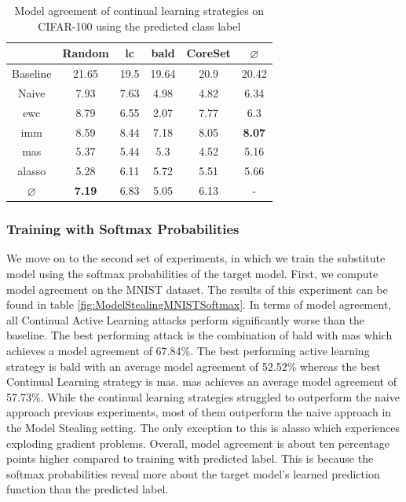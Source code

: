 \begin{table}[h]
    \centering
    \begin{tabular}{ c | c c c c | c } 
         & Random & \gls{lc} & \gls{bald} & CoreSet & $\varnothing$\\ 
        \hline
        Baseline & 21.65 & 19.5 & 19.64 & 20.9 & 20.42\\
        \hline
        Naive & 7.93 & 7.63 & 4.98 & 4.82 & 6.34\\
        \gls{ewc} & 8.79 & 6.55 & 2.07 & 7.77 & 6.3\\
        \gls{imm} & 8.59 & 8.44 & 7.18 & 8.05 & \textbf{8.07}\\
        \gls{mas} & 5.37 & 5.44 & 5.3 & 4.52 & 5.16\\
        \gls{alasso} & 5.28 & 6.11 & 5.72 & 5.51 & 5.66\\
        \hline
        $\varnothing$ & \textbf{7.19} & 6.83 & 5.05 & 6.13 & -\\
    \end{tabular}
    \caption{Model agreement of continual learning strategies on CIFAR-100 using the predicted class label}
    \label{fig:ModelStealingCIFAR100Label}
\end{table}




\subsubsection{Training with Softmax Probabilities}
\label{sec:Evaluation:MS:Regularization:Softmax}

We move on to the second set of experiments, in which we train the substitute model using the softmax probabilities of the target model. First, we compute model agreement
on the MNIST dataset. The results of this experiment can be found in table \ref{fig:ModelStealingMNISTSoftmax}. In terms of model agreement, all Continual
Active Learning attacks perform significantly worse than the baseline. The best performing attack is the combination of \gls{bald} with \gls{mas} which achieves a model
agreement of 67.84\%. The best performing active learning strategy is \gls{bald} with an average model agreement of 52.52\% whereas the best Continual Learning strategy is
\gls{mas}. \gls{mas} achieves an average model agreement of 57.73\%. While the continual learning strategies struggled to outperform the naive approach previous experiments,
most of them outperform the naive approach in the Model Stealing setting. The only exception to this is \gls{alasso} which experiences exploding gradient problems. Overall,
model agreement is about ten percentage points higher compared to training with predicted label. This is because the softmax probabilities reveal more about the target model's
learned prediction function than the predicted label. \par 

